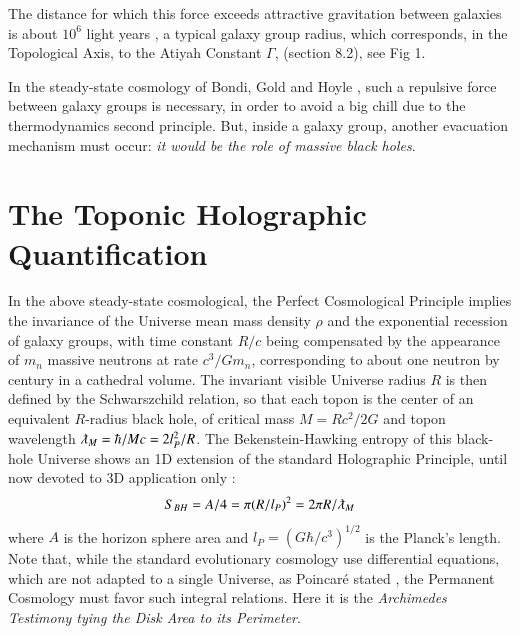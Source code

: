 \documentclass[twoside,draft]{article}
\begin{document}
\begin{sloppypar}
The distance for which this force exceeds attractive gravitation between galaxies is about $10^{6}$ light years \cite{Sanchez1}, a typical galaxy group radius, which corresponds, in the Topological Axis, to the Atiyah Constant $\Gamma$, (section 8.2), see Fig 1.

In the steady-state cosmology of Bondi, Gold and Hoyle \cite{Sanchez1}, such a repulsive force between galaxy groups is necessary, in order to avoid a big chill due to the thermodynamics second principle. But, inside a galaxy group, another evacuation mechanism must occur: \textit{it would be the role of massive black holes}.

\section{The Toponic Holographic Quantification}

In the above steady-state cosmological, the Perfect Cosmological Principle implies the invariance of the Universe mean mass density $\rho$ and the exponential recession of galaxy groups, with time constant $R/c$ being compensated by the appearance of $m_n$ massive neutrons at rate $c^{3} /Gm_{n}$, 
corresponding to about one neutron by century in a cathedral volume. 
The invariant visible Universe radius $R$ is then defined by the Schwarszchild relation, so that each topon is the center of an equivalent $R$-radius black hole, of critical mass $M = Rc^{2} /2G$ and topon wavelength $\lambdabar_M = \hbar/Mc = 2l_{P}^{2} /R$. The Bekenstein-Hawking entropy of this black-hole Universe shows an 1D extension of the standard Holographic
Principle, until now devoted to 3D application only \cite{Bousso}:
\begin{equation}
S_{BH} = A/4 = \pi(R/l_{P})^{2} = 2\pi R/\lambdabar_{M}
\end{equation}
where $A$ is the horizon sphere area and $l_{P} = (G\hbar/c^{3} )^{1/2}$ is the Planck's length. Note that, while the standard evolutionary cosmology use differential equations, which are not adapted to a single Universe, as Poincar\'{e} stated \cite{Sanchez1}, the Permanent Cosmology must favor such integral relations. Here it is the \textit{Archimedes Testimony tying the Disk Area to its Perimeter}.


\end{sloppypar}
\end{document}
